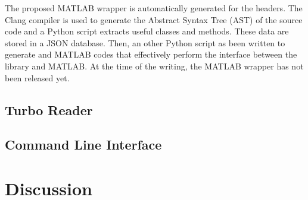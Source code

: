 The proposed MATLAB wrapper is automatically generated for the \AFFECT headers.
The Clang compiler is used to generate the Abstract Syntax Tree (AST) of the
\AFFECT source code and a Python script extracts useful classes and methods.
These data are stored in a JSON database. Then, an other Python script as been
written to generate \Cxx and MATLAB codes that effectively perform the interface
between the \AFFECT library and MATLAB.
At the time of the writing, the MATLAB wrapper has not been released yet.

\subsection{Turbo Reader}

\subsection{Command Line Interface}

\section{Discussion}
